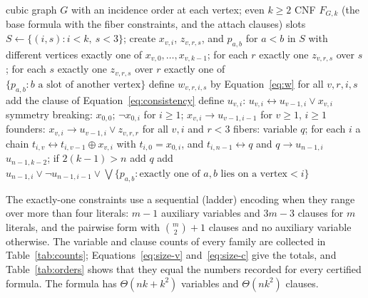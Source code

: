\begin{algorithm}[t]
\caption{Construction of the formula $F_{G,k}$ for a cubic graph $G$ with vertices $0, \dots, n-1$ and an even target order $k \ge 2$. Exactly-one constraints over $m > 4$ literals use the sequential ladder ($m-1$ auxiliary variables, $3m-3$ clauses) and the pairwise form otherwise; $u_{-1,i}$ is the constant false.}\label{alg:formula}
\begin{algorithmic}[1]
\Require cubic graph $G$ with an incidence order at each vertex; even $k \ge 2$
\Ensure CNF $F_{G,k}$ (the base formula with the fiber constraints, and the attach clauses)
\State slots $S \gets \{(i,s) : i < k,\ s < 3\}$; create $x_{v,i}$, $z_{v,r,s}$, and $p_{a,b}$ for $a < b$ in $S$ with different vertices
  \State exactly one of $x_{v,0}, \dots, x_{v,k-1}$; for each $r$ exactly one $z_{v,r,s}$ over $s$; for each $s$ exactly one $z_{v,r,s}$ over $r$
\EndFor
{}
  \State exactly one of $\{p_{a,b} : b \text{ a slot of another vertex}\}$
\EndFor
\State define $w_{v,r,i,s}$ by Equation~\eqref{eq:w} for all $v, r, i, s$
  \State add the clause of Equation~\eqref{eq:consistency}
\EndFor
\State define $u_{v,i}$: $u_{v,i} \leftrightarrow u_{v-1,i} \vee x_{v,i}$ 
\State symmetry breaking: $x_{0,0}$; $\neg x_{0,i}$ for $i \ge 1$; $x_{v,i} \to u_{v-1,i-1}$ for $v \ge 1$, $i \ge 1$
\State founders: $x_{v,i} \to u_{v-1,i} \vee z_{v,r,r}$ for all $v, i$ and $r < 3$
\State fibers: variable $q$; for each $i$ a chain $t_{i,v} \leftrightarrow t_{i,v-1} \oplus x_{v,i}$ with $t_{i,0} = x_{0,i}$, and $t_{i,n-1} \leftrightarrow q$ and $q \to u_{n-1,i}$
\State $u_{n-1,k-2}$; if $2(k-1) > n$ add $q$
 
  \State add $u_{n-1,i} \vee \neg u_{n-1,i-1} \vee \bigvee \{p_{a,b} : \text{exactly one of } a, b \text{ lies on a vertex} < i\}$
\EndFor
\end{algorithmic}
\end{algorithm}

The exactly-one constraints use a sequential (ladder) encoding when they range over more than four literals: $m-1$ auxiliary variables and $3m-3$ clauses
for $m$ literals, and the pairwise form with $\binom m2 + 1$ clauses and no auxiliary variable otherwise. The variable and clause counts of every family are
collected in Table~\ref{tab:counts}; Equations~\eqref{eq:size-v} and~\eqref{eq:size-c} give the totals, and Table~\ref{tab:orders} shows that they equal the
numbers recorded for every certified formula. The formula has $\Theta(nk + k^2)$ variables and $\Theta(nk^2)$ clauses.

